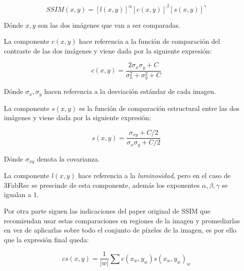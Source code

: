             \begin{equation}
                SSIM(x,y)=[l(x,y)]^\alpha[c(x,y)]^{\beta}[s(x,y)]^{\gamma}
            \end{equation}

            \medskip

            \noindent Dónde $x,y$ son las dos imágenes que van a ser comparadas.

            \medskip

            \noindent La componente $c(x,y)$ hace referencia a la función de comparación del contraste de las dos imágenes y viene dada por la siguiente expresión: 

            \begin{equation}
                c(x,y)=\frac{2\sigma_x \sigma_y + C}{\sigma_x^2+ \sigma_y^2+C}
            \end{equation}

            \noindent Dónde $\sigma_x, \sigma_y$ hacen referencia a la desviación estándar de cada imagen.

            \medskip

            \noindent La componente $s(x,y)$ es la función de comparación estructural entre las dos imágenes y viene dada por la siguiente expresión:

            \begin{equation}
                s(x,y)=\frac{\sigma_{xy}+C/2}{\sigma_x \sigma_y +C/2}
            \end{equation}

            \noindent Dónde $\sigma_{xy}$ denota la covarianza.

            \medskip

            \noindent La componente $l(x,y)$ hace referencia a la \textit{luminosidad}, pero en el caso de 3FabRec se prescinde de esta componente, además los exponentes $\alpha, \beta , \gamma$ se igualan a $1$.

            \medskip

            \noindent Por otra parte siguen las indicaciones del paper original de SSIM que recomiendan usar estas comparaciones en regiones de la imagen y promediarlas en vez de aplicarlas sobre todo el conjunto de píxeles de la imagen, es por ello que la expresión final queda:

            \begin{equation}
                cs(x,y)=\frac{1}{|w|} \sum{c(x_w,y_w)s(x_w,y_w)}_w
            \end{equation}

